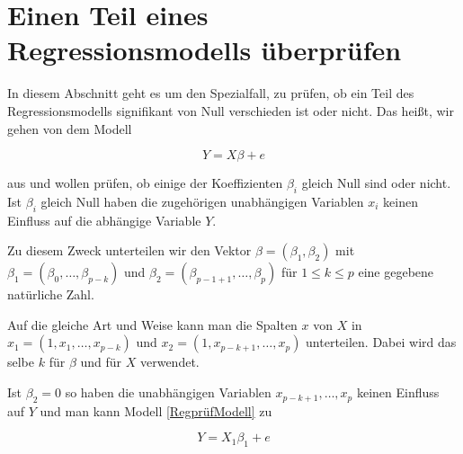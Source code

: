 \documentclass[12pt,a4paper]{article}
\theoremstyle{definition}
\theoremstyle{definition}
\theoremstyle{definition}
\theoremstyle{definition}
\begin{document}
%
%


\newpage
\section{Einen Teil eines Regressionsmodells überprüfen}
\label{Teil eines Regressionsmodells überprüfen}
In diesem Abschnitt geht es um den Spezialfall, zu prüfen, ob ein Teil des Regressionsmodells signifikant von Null verschieden ist oder nicht.  Das heißt, wir gehen von dem Modell

\begin{equation} \label{RegprüfModell}
Y=X \beta + e
\end{equation}

aus und wollen prüfen, ob einige der Koeffizienten $\beta_i$ gleich Null sind oder nicht. Ist $\beta_i$ gleich Null haben die zugehörigen unabhängigen Variablen $x_i$ keinen Einfluss auf die abhängige Variable $Y$.  

Zu diesem Zweck unterteilen wir den Vektor $\beta=(\beta_1,\beta_2)$ mit $\beta_1=(\beta_0, \ldots, \beta_{p-k})$ und $\beta_2=(\beta_{p-1+1}, \ldots, \beta_{p})$ für $1 \leq k \leq p$ eine gegebene natürliche Zahl. 

Auf die gleiche Art und Weise kann man die Spalten $x$ von $X$ in $x_1=(1,x_1, \ldots, x_{p-k})$ und $x_2=(1,x_{p-k+1}, \ldots, x_{p})$ unterteilen. Dabei wird das selbe $k$ für $\beta$ und für $X$ verwendet.

Ist $\beta_2=0$ so haben die unabhängigen Variablen $x_{p-k+1}, \ldots, x_p$ keinen Einfluss auf $Y$ und man kann Modell \eqref{RegprüfModell} zu 

\begin{equation}
Y=X_1 \beta_1 + e
\end{equation}
\end{document}
